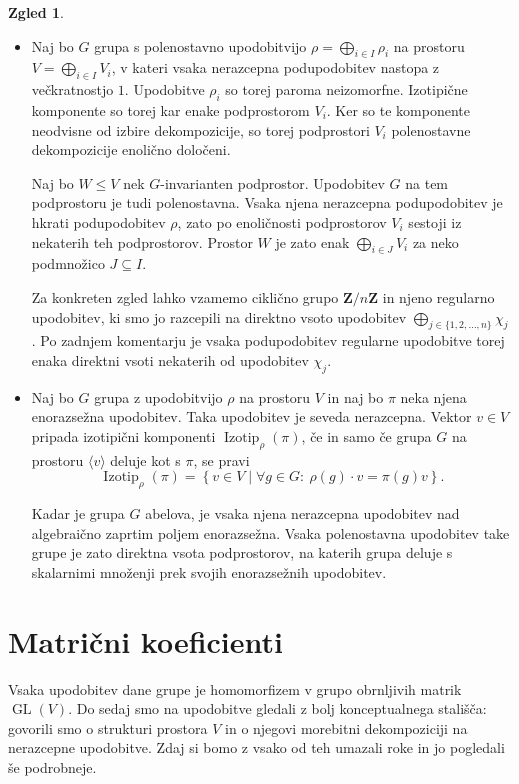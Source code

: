 \documentclass[11pt]{book}
\def\ZZ{\mathbf{Z}}
\DeclareMathOperator\Izotip{Izotip}
\DeclareMathOperator\GL{GL}
\theoremstyle{definition}
\theoremstyle{zgled}
\newtheorem*{zgled}{Zgled}
\theoremstyle{odprtproblem}
\theoremstyle{domacanaloga}
\theoremstyle{izrek}
\begin{document}
\begin{zgled} \leavevmode
\begin{itemize}
\item Naj bo $G$ grupa s polenostavno upodobitvijo $\rho = \bigoplus_{i \in I} \rho_i$ na prostoru $V = \bigoplus_{i \in I} V_i$, v kateri vsaka nerazcepna podupodobitev nastopa z večkratnostjo $1$. Upodobitve $\rho_i$ so torej paroma neizomorfne. Izotipične komponente so torej kar enake podprostorom $V_i$. Ker so te komponente neodvisne od izbire dekompozicije, so torej podprostori $V_i$ polenostavne dekompozicije enolično določeni.

Naj bo $W \leq V$ nek $G$-invarianten podprostor. Upodobitev $G$ na tem podprostoru je tudi polenostavna. Vsaka njena nerazcepna podupodobitev je hkrati podupodobitev $\rho$, zato po enoličnosti podprostorov $V_i$ sestoji iz nekaterih teh podprostorov. Prostor $W$ je zato enak $\bigoplus_{i \in J} V_i$ za neko podmnožico $J \subseteq I$.

Za konkreten zgled lahko vzamemo ciklično grupo $\ZZ/n\ZZ$ in njeno regularno upodobitev, ki smo jo razcepili na direktno vsoto upodobitev $\bigoplus_{j \in \{ 1,2,\dots,n \}} \chi_j$. Po zadnjem komentarju je vsaka podupodobitev regularne upodobitve torej enaka direktni vsoti nekaterih od upodobitev $\chi_j$.

\item Naj bo $G$ grupa z upodobitvijo $\rho$ na prostoru $V$ in naj bo $\pi$ neka njena enorazsežna upodobitev. Taka upodobitev je seveda nerazcepna. Vektor $v \in V$ pripada izotipični komponenti $\Izotip_{\rho}(\pi)$, če in samo če grupa $G$ na prostoru $\langle v \rangle$ deluje kot s $\pi$, se pravi
\[
    \displaystyle \Izotip_{\rho}(\pi) = \left\{ v \in V \mid \forall g \in G \colon \ \rho(g) \cdot v = \pi(g) v \right\}.
\]

Kadar je grupa $G$ abelova, je vsaka njena nerazcepna upodobitev nad algebraično zaprtim poljem enorazsežna. Vsaka polenostavna upodobitev take grupe je zato direktna vsota podprostorov, na katerih grupa deluje s skalarnimi množenji prek svojih enorazsežnih upodobitev.
\end{itemize}
\end{zgled}


\section{Matrični koeficienti}

Vsaka upodobitev dane grupe je homomorfizem v grupo obrnljivih matrik $\GL(V)$. Do sedaj smo na upodobitve gledali z bolj konceptualnega stališča: govorili smo o strukturi prostora $V$ in o njegovi morebitni dekompoziciji na nerazcepne upodobitve. Zdaj si bomo z vsako od teh umazali roke in jo pogledali še podrobneje. 
\end{document}
